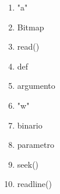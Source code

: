 
\begin{multicols}{5}
  \begin{enumerate}
    \item "a"
    \item Bitmap
    \item read()
    \item def
    \item argumento
    \item "w"
    \item binario
    \item parametro
    \item seek()
    \item readline()
  \end{enumerate}
\end{multicols}
